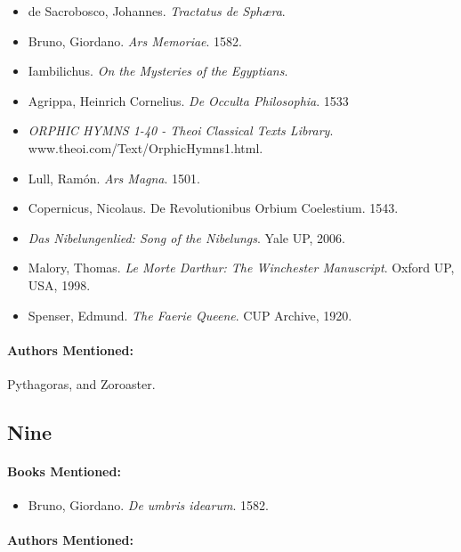 \documentclass[12pt]{article}
\providecommand{\tightlist}{%
  \setlength{\itemsep}{0pt}\setlength{\parskip}{0pt}}
\begin{document}
\begin{itemize}
\tightlist
\item
  de Sacrobosco, Johannes. \emph{Tractatus de Sphæra}.
\item
  Bruno, Giordano. \emph{Ars Memoriae}. 1582.
\item
  Iambilichus. \emph{On the Mysteries of the Egyptians}.
\item
  Agrippa, Heinrich Cornelius. \emph{De Occulta Philosophia}. 1533
\item
  \emph{ORPHIC HYMNS 1-40 - Theoi Classical Texts Library}. www.theoi.com/Text/OrphicHymns1.html.
\item
  Lull, Ramón. \emph{Ars Magna}. 1501.
\item
  Copernicus, Nicolaus. De Revolutionibus Orbium Coelestium. 1543.
\item
  \emph{Das Nibelungenlied: Song of the Nibelungs}. Yale UP, 2006.
\item
  Malory, Thomas. \emph{Le Morte Darthur: The Winchester Manuscript}. Oxford UP, USA, 1998.
\item
  Spenser, Edmund. \emph{The Faerie Queene}. CUP Archive, 1920.
\end{itemize}

\paragraph{Authors Mentioned:}\label{authors-mentioned-16}

Pythagoras, and Zoroaster.

\subsection{Nine}\label{nine}

\paragraph{Books Mentioned:}\label{books-mentioned-23}

\begin{itemize}
\tightlist
\item
  Bruno, Giordano. \emph{De umbris idearum}. 1582.
\end{itemize}

\paragraph{Authors Mentioned:}\label{authors-mentioned-17}
\end{document}
